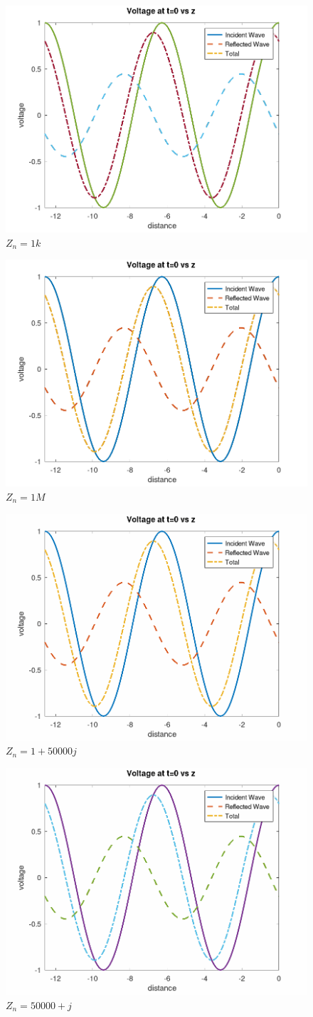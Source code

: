 \begin{enumerate}
\begin{multicols}{2}
      \begin{figure}[H]
        \centering
        \includegraphics[width=.5\textwidth]{Figures/Lab Two/Zn1k.png}
        \caption{$Z_n=1k$}
        \label{fig:3}
      \end{figure}

      \begin{figure}[H]
        \centering
        \includegraphics[width=.5\textwidth]{Figures/Lab Two/Zn1M.png}
        \caption{$Z_n=1M$}
        \label{fig:4}
      \end{figure}

      \begin{figure}[H]
        \centering
        \includegraphics[width=.5\textwidth]{Figures/Lab Two/Zn1-50ki.png}
        \caption{$Z_n=1+50000j$}
        \label{fig:5}
      \end{figure}

      \begin{figure}[H]
        \centering
        \includegraphics[width=.5\textwidth]{Figures/Lab Two/Zn50k-1i.png}
        \caption{$Z_n=50000+j$}
        \label{fig:6}
      \end{figure}


\end{multicols}
\end{enumerate}
